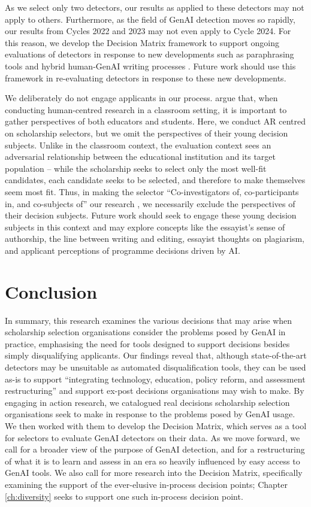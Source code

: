 As we select only two detectors, our results as applied to these detectors may not apply to others. Furthermore, as the field of GenAI detection moves so rapidly, our results from Cycles 2022 and 2023 may not even apply to Cycle 2024. For this reason, we develop the Decision Matrix framework to support ongoing evaluations of detectors in response to new developments such as paraphrasing tools and hybrid human-GenAI writing processes \cite{kalpesh_krishna_paraphrasing_2023}. Future work should use this framework in re-evaluating detectors in response to these new developments.

We deliberately do not engage applicants in our process. \textcite{venn-wycherley_realities_2024} argue that, when conducting human-centred research in a classroom setting, it is important to gather perspectives of both educators and students. Here, we conduct AR centred on scholarship selectors, but we omit the perspectives of their young decision subjects. Unlike in the classroom context, the evaluation context sees an adversarial relationship between the educational institution and its target population – while the scholarship seeks to select only the most well-fit candidates, each candidate seeks to be selected, and therefore to make themselves seem most fit. Thus, in making the selector ``Co-investigators of, co-participants in, and co-subjects of'' our research \cite{Hayes_2011}, we necessarily exclude the perspectives of their decision subjects. Future work should seek to engage these young decision subjects in this context and may explore concepts like the essayist's sense of authorship, the line between writing and editing, essayist thoughts on plagiarism, and applicant perceptions of programme decisions driven by AI.

\section{Conclusion}
In summary, this research examines the various decisions that may arise when scholarship selection organisations consider the problems posed by GenAI in practice, emphasising the need for tools designed to support decisions besides simply disqualifying applicants. Our findings reveal that, although state-of-the-art detectors may be unsuitable as automated disqualification tools, they can be used as-is to support ``integrating technology, education, policy reform, and assessment restructuring'' \cite{MikePerkins_JasperRoe_2023} and support ex-post decisions organisations may wish to make. By engaging in action research, we catalogued real decisions scholarship selection organisations seek to make in response to the problems posed by GenAI usage. We then worked with them to develop the Decision Matrix, which serves as a tool for selectors to evaluate GenAI detectors on their data. As we move forward, we call for a broader view of the purpose of GenAI detection, and for a restructuring of what it is to learn and assess in an era so heavily influenced by easy access to GenAI tools. We also call for more research into the Decision Matrix, specifically examining the support of the ever-elusive in-process decision points; Chapter \ref{ch:diversity} seeks to support one such in-process decision point.